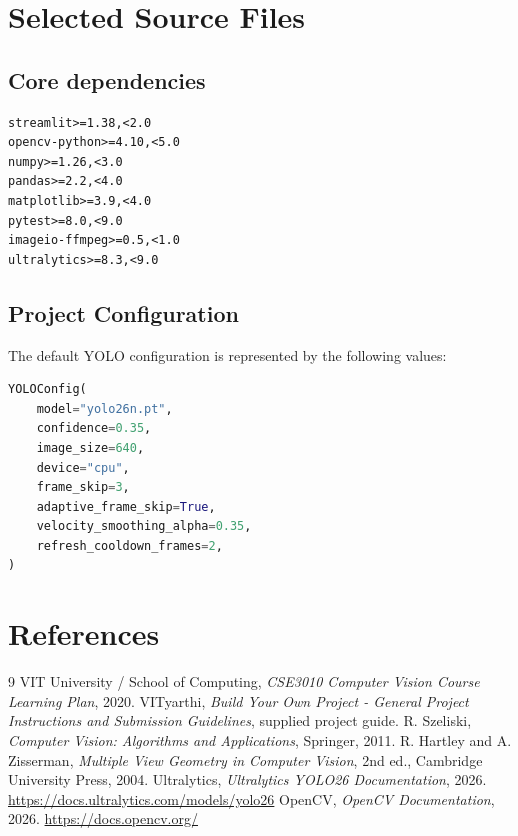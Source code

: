 \documentclass[12pt,a4paper]{report}
\begin{document}
\chapter{Selected Source Files}
\section{Core dependencies}
\begin{lstlisting}
streamlit>=1.38,<2.0
opencv-python>=4.10,<5.0
numpy>=1.26,<3.0
pandas>=2.2,<4.0
matplotlib>=3.9,<4.0
pytest>=8.0,<9.0
imageio-ffmpeg>=0.5,<1.0
ultralytics>=8.3,<9.0
\end{lstlisting}

\section{Project Configuration}
The default YOLO configuration is represented by the following values:
\begin{lstlisting}[language=Python]
YOLOConfig(
    model="yolo26n.pt",
    confidence=0.35,
    image_size=640,
    device="cpu",
    frame_skip=3,
    adaptive_frame_skip=True,
    velocity_smoothing_alpha=0.35,
    refresh_cooldown_frames=2,
)
\end{lstlisting}

\chapter{References}
\begin{thebibliography}{9}
 VIT University / School of Computing, \emph{CSE3010 Computer Vision Course Learning Plan}, 2020.
 VITyarthi, \emph{Build Your Own Project - General Project Instructions and Submission Guidelines}, supplied project guide.
 R. Szeliski, \emph{Computer Vision: Algorithms and Applications}, Springer, 2011.
 R. Hartley and A. Zisserman, \emph{Multiple View Geometry in Computer Vision}, 2nd ed., Cambridge University Press, 2004.
 Ultralytics, \emph{Ultralytics YOLO26 Documentation}, 2026. \url{https://docs.ultralytics.com/models/yolo26}
 OpenCV, \emph{OpenCV Documentation}, 2026. \url{https://docs.opencv.org/}
\end{thebibliography}
\end{document}
